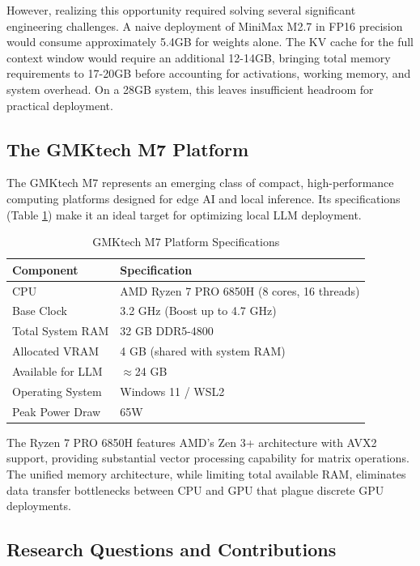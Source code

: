 However, realizing this opportunity required solving several significant engineering challenges. A naive deployment of MiniMax M2.7 in FP16 precision would consume approximately 5.4GB for weights alone. The KV cache for the full context window would require an additional 12-14GB, bringing total memory requirements to 17-20GB before accounting for activations, working memory, and system overhead. On a 28GB system, this leaves insufficient headroom for practical deployment.

\subsection{The GMKtech M7 Platform}

The GMKtech M7 represents an emerging class of compact, high-performance computing platforms designed for edge AI and local inference. Its specifications (Table \ref{tab:m7_specs}) make it an ideal target for optimizing local LLM deployment.

\begin{table}[h]
\centering
\caption{GMKtech M7 Platform Specifications}
\label{tab:m7_specs}
\begin{tabular}{ll}
\toprule
\textbf{Component} & \textbf{Specification} \\
\midrule
CPU & AMD Ryzen 7 PRO 6850H (8 cores, 16 threads) \\
Base Clock & 3.2 GHz (Boost up to 4.7 GHz) \\
Total System RAM & 32 GB DDR5-4800 \\
Allocated VRAM & 4 GB (shared with system RAM) \\
Available for LLM & $\approx$24 GB \\
Operating System & Windows 11 / WSL2 \\
Peak Power Draw & 65W \\
\bottomrule
\end{tabular}
\end{table}

The Ryzen 7 PRO 6850H features AMD's Zen 3+ architecture with AVX2 support, providing substantial vector processing capability for matrix operations. The unified memory architecture, while limiting total available RAM, eliminates data transfer bottlenecks between CPU and GPU that plague discrete GPU deployments.

\subsection{Research Questions and Contributions}

